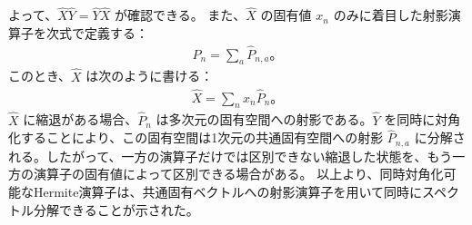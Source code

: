 \documentclass[platex,dvipdfmx,a4paper]{jsarticle}
\begin{document}
よって、$\hat{X}\hat{Y}=\hat{Y}\hat{X}$ が確認できる。
また、$\hat{X}$ の固有値 $x_n$ のみに着目した射影演算子を次式で定義する：
\begin{align*}
  \hat{P}_n=\sum_a\hat{P}_{n,a}。
\end{align*}
このとき、$\hat{X}$ は次のように書ける：
\begin{align*}
  \hat{X}=\sum_n x_n\hat{P}_n。
\end{align*}
$\hat{X}$ に縮退がある場合、$\hat{P}_n$ は多次元の固有空間への射影である。$\hat{Y}$ を同時に対角化することにより、この固有空間は1次元の共通固有空間への射影 $\hat{P}_{n,a}$ に分解される。したがって、一方の演算子だけでは区別できない縮退した状態を、もう一方の演算子の固有値によって区別できる場合がある。
以上より、同時対角化可能なHermite演算子は、共通固有ベクトルへの射影演算子を用いて同時にスペクトル分解できることが示された。\\
\end{document}
